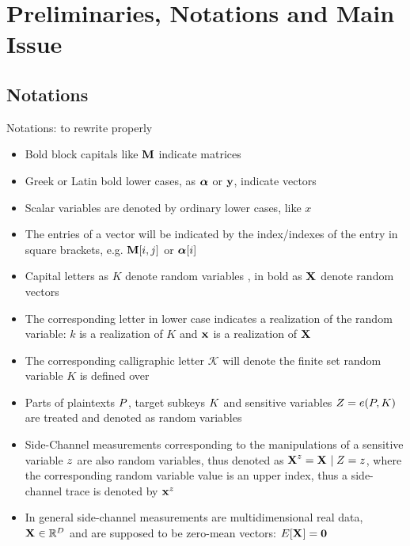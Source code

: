 \section{Preliminaries, Notations and Main Issue}

\subsection{Notations}
\begin{tiny}
Notations: to rewrite properly
\begin{itemize}

\item Bold block capitals like $\measuresMatrix$ indicate matrices
\item Greek or Latin bold lower cases, as $\AAlpha$ or   $\yyy$, indicate vectors
\item Scalar variables are denoted by ordinary lower cases, like $x$
\item The entries of a vector will be indicated by the index/indexes of the entry in square brackets, e.g. $\measuresMatrix[i,j]$ or $\AAlpha[i]$
\medskip
\item Capital letters as $K$ denote random variables , in bold as $\SSS[]{}$ denote random vectors
\item The corresponding letter in lower case indicates a realization of the random variable: $k$ is a realization of $K$ and $\sss[]{}$ is a realization of $\SSS[]{}$
\item The corresponding calligraphic letter $\mathcal{K}$ will denote the finite set random variable $K$ is defined over
\medskip
\item Parts of plaintexts $\randPlaintext$, target subkeys $\randKey$ and sensitive variables $\sensRandVar = \targetFunction(\randPlaintext,\randKey)$ are treated and denoted as random variables
\item Side-Channel measurements corresponding to the manipulations of a sensitive variable $\sensVar$ are also random variables, thus denoted as $\SSS = \SSS []\mid \sensRandVar = \sensVar$, where the corresponding random variable value is an upper index, thus a side-channel trace is denoted by $\sss{}$
\item In general side-channel measurements are multidimensional real data, $\SSS[]{} \in \mathbb{R}^D$ and are supposed to be zero-mean vectors: $E[\SSS[]] = \textbf{0}$

\end{itemize}
\end{tiny}
